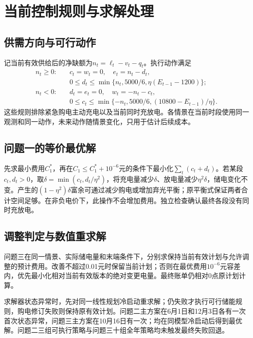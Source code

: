 \section{当前控制规则与求解处理}\label{app:implementation}
\subsection{供需方向与可行动作}
记当前有效供给后的净缺额为$n_t=\ell_t-v_t-q_t$。执行动作满足
\begin{align}
n_t\ge0:\quad &c_t=w_t=0,\quad e_t=n_t-d_t,\nonumber\\
&0\le d_t\le\min\{n_t,5000/6,\eta(E_{t-1}-1200)\};\\
n_t<0:\quad &d_t=e_t=0,\quad w_t=-n_t-c_t,\nonumber\\
&0\le c_t\le\min\{-n_t,5000/6,(10800-E_{t-1})/\eta\}.
\end{align}
这些规则排除紧急购电主动充电以及当前同时充放电。各情景在当前时段使用同一观测和同一动作，未来动作随情景变化，只用于估计后续成本。

\subsection{问题一的等价最优解}
先求最小费用$C_1^*$，再在$C_1\le C_1^*+10^{-6}$元的条件下最小化$\sum_t(c_t+d_t)$。若某段$c_t,d_t>0$，取$\delta=\min(c_t,d_t/\eta^2)$，将充电量减少$\delta$、放电量减少$\eta^2\delta$，储电变化不变。产生的$(1-\eta^2)\delta$富余可通过减少购电或增加弃光平衡；原平衡式保证两者合计空间足够。在非负电价下，此操作不会增加费用。独立检查确认最终各段没有同时充放电。

\subsection{调整判定与数值重求解}
问题三在同一情景、实际储电量和末端条件下，分别求保持当前有效计划与允许调整的预计费用。改善不超过0.01元时保留当前计划；否则在最优费用$10^{-6}$元容差内，优先最小化相对当前有效版本的绝对变更电量。最终账单仍相对0点原计划计算。

求解器状态异常时，先对同一线性规划冷启动重求解；仍失败才执行可行储能规则，购电修订失败则保持原有效计划。问题二主方案在6月1日和12月3日各有一次首次状态异常，问题三主方案在10月16日有一次；均在同模型冷启动后得到最优解。问题二三组可执行策略与问题三十组全年策略均未触发最终失败回退。

